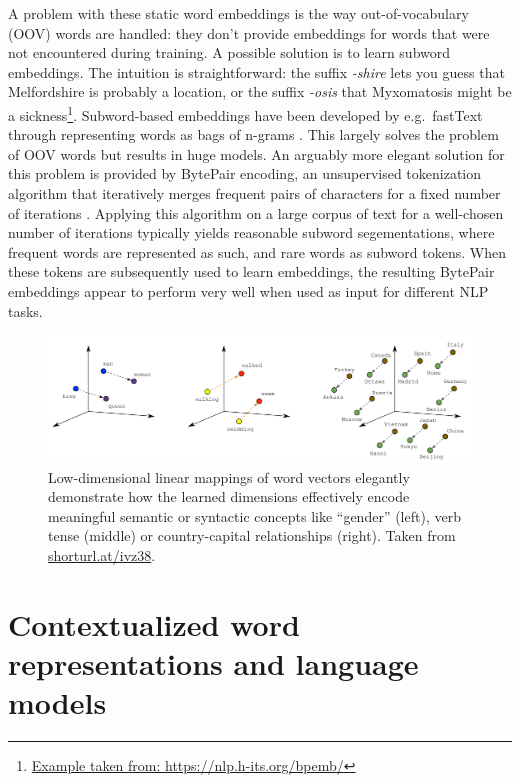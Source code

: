 \documentclass[12pt,a4paper,]{book}
\begin{document}
A problem with these static word embeddings is the way out-of-vocabulary (OOV) words are handled: they don't provide embeddings for words that were not encountered during training. A possible solution is to learn subword embeddings. The intuition is straightforward: the suffix \emph{-shire} lets you guess that Melfordshire is probably a location, or the suffix \emph{-osis} that Myxomatosis might be a sickness\footnote{\href{https://nlp.h-its.org/bpemb/\#}{Example taken from: https://nlp.h-its.org/bpemb/}}. Subword-based embeddings have been developed by e.g.~fastText through representing words as bags of n-grams \citep{bojanowski2017}. This largely solves the problem of OOV words but results in huge models. An arguably more elegant solution for this problem is provided by BytePair encoding, an unsupervised tokenization algorithm that iteratively merges frequent pairs of characters for a fixed number of iterations \citep{sennrich2016}. Applying this algorithm on a large corpus of text for a well-chosen number of iterations typically yields reasonable subword segementations, where frequent words are represented as such, and rare words as subword tokens. When these tokens are subsequently used to learn embeddings, the resulting BytePair embeddings appear to perform very well when used as input for different NLP tasks.

\begin{figure}

{\centering \includegraphics[width=1\linewidth]{images/word_vectors} 

}

\caption{Low-dimensional linear mappings of word vectors elegantly demonstrate how the learned dimensions effectively encode meaningful semantic or syntactic concepts like ``gender'' (left), verb tense (middle) or country-capital relationships (right). Taken from \url{shorturl.at/ivz38}.}\label{fig:w2v}
\end{figure}



\hypertarget{contextualized-word-representations-and-language-models}{%
\section{Contextualized word representations and language models}\label{contextualized-word-representations-and-language-models}}
\end{document}
